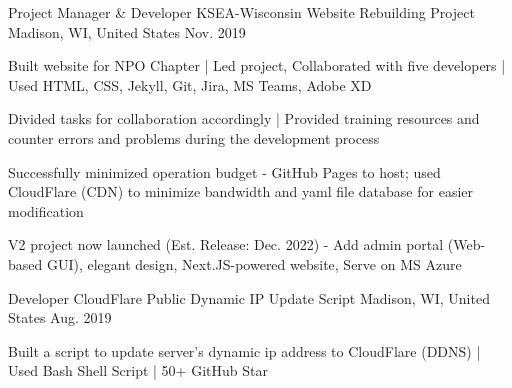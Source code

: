 \begin{cventries}
  \cventry
  {Project Manager \& Developer} %
  {KSEA-Wisconsin Website Rebuilding Project} %
  {Madison, WI, United States} %
  {Nov. 2019} %
  {
    \begin{cvitems} %
      \item {Built website for NPO Chapter | Led project, Collaborated with five developers | Used HTML, CSS, Jekyll, Git, Jira, MS Teams, Adobe XD}
      \item {Divided tasks for collaboration accordingly | Provided training resources and counter errors and problems during the development process}
      \item {Successfully minimized operation budget - GitHub Pages to host; used CloudFlare (CDN) to minimize bandwidth and yaml file database for easier modification}
      \item {V2 project now launched (Est. Release: Dec. 2022) - Add admin portal (Web-based GUI), elegant design, Next.JS-powered website, Serve on MS Azure}
    \end{cvitems}
  }

  \cventry
  {Developer} %
  {CloudFlare Public Dynamic IP Update Script} %
  {Madison, WI, United States} %
  {Aug. 2019} %
  {
    \begin{cvitems} %
      \item {Built a script to update server's dynamic ip address to CloudFlare (DDNS) | Used Bash Shell Script | 50+ GitHub Star}
    \end{cvitems}
  }

\end{cventries}
